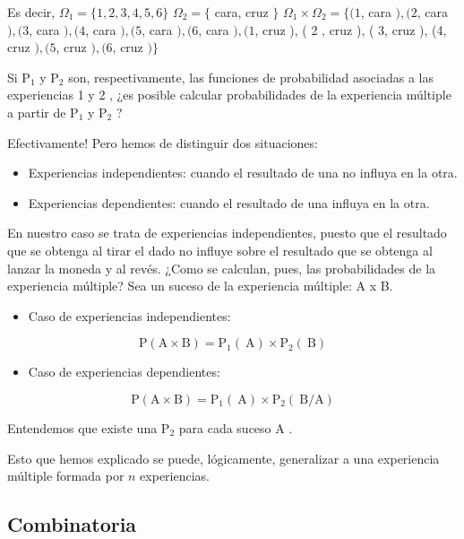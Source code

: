 \documentclass[
]{article}
\providecommand{\tightlist}{%
  \setlength{\itemsep}{0pt}\setlength{\parskip}{0pt}}
\begin{document}
Es decir, \(\Omega_{1}=\{1,2,3,4,5,6\}\) \(\Omega_{2}=\{\) cara, cruz \(\}\)
\(\Omega_{1} \times \Omega_{2}=\{(1\), cara \(),(2\), cara \(),(3\), cara
\(),(4\), cara \(),(5\), cara \(),(6\), cara \(),(1\), cruz ), ( 2 , cruz ), (
3, cruz ), (4, cruz \(),(5\), cruz \(),(6\), cruz \()\}\)

Si \(\mathrm{P}_{1}\) y \(\mathrm{P}_{2}\) son, respectivamente, las
funciones de probabilidad asociadas a las experiencias 1 y 2 , ¿es
posible calcular probabilidades de la experiencia múltiple a partir de
\(\mathrm{P}_{1}\) y \(\mathrm{P}_{2}\) ?

Efectivamente! Pero hemos de distinguir dos situaciones:

\begin{itemize}
\tightlist
\item
  Experiencias independientes: cuando el resultado de una no influya
  en la otra.
\item
  Experiencias dependientes: cuando el resultado de una influya en la
  otra.
\end{itemize}

En nuestro caso se trata de experiencias independientes, puesto que el
resultado que se obtenga al tirar el dado no influye sobre el resultado
que se obtenga al lanzar la moneda y al revés. ¿Como se calculan, pues,
las probabilidades de la experiencia múltiple? Sea un suceso de la
experiencia múltiple: A x B.

\begin{itemize}
\tightlist
\item
  Caso de experiencias independientes:
\end{itemize}

\[
\mathrm{P}(\mathrm{A} \times \mathrm{B})=\mathrm{P}_{1}(\mathrm{~A}) \times \mathrm{P}_{2}(\mathrm{~B})
\]

\begin{itemize}
\tightlist
\item
  Caso de experiencias dependientes:
\end{itemize}

\[
\mathrm{P}(\mathrm{A} \times \mathrm{B})=\mathrm{P}_{1}(\mathrm{~A}) \times \mathrm{P}_{2}(\mathrm{~B} / \mathrm{A})
\]

Entendemos que existe una \(\mathrm{P}_{2}\) para cada suceso A .

Esto que hemos explicado se puede, lógicamente, generalizar a una
experiencia múltiple formada por \(n\) experiencias.

\subsection{Combinatoria}\label{combinatoria}
\end{document}
